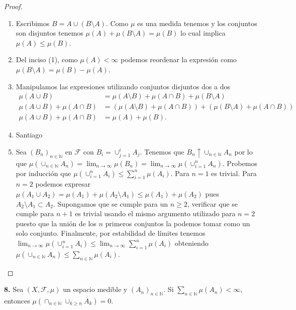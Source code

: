 \documentclass{article}
\newenvironment{statement}[1]{\smallskip\noindent\color[rgb]{1.00,0.00,0.50} {\bf #1.}}{}
\theoremstyle{definition}
\theoremstyle{remark}
\newcommand{\BN}{\mathbb N}
\begin{document}
\begin{proof}
  \begin{enumerate}
    \item Escribimos $B = A \cup (B \setminus A)$. Como $\mu$ es una medida tenemos y los conjuntos son disjuntos tenemos
      $\mu(A) + \mu(B \setminus A) = \mu(B)$ lo cual implica $\mu(A) \leq \mu(B)$.
    \item Del inciso (1), como $\mu(A) < \infty$ podemos reordenar la expresi\'on como $\mu(B \setminus A) = \mu(B) - \mu(A)$.
    \item Manipulamos las expresiones utilizando conjuntos disjuntos dos a dos
      \begin{align*}
        \mu(A \cup B) &= \mu(A \setminus B) + \mu(A \cap B) + \mu(B \setminus A)\\
        \mu(A \cup B) + \mu(A \cap B) &= (\mu(A \setminus B) + \mu(A \cap B)) + (\mu(B \setminus A) + \mu(A \cap B))\\
        \mu(A \cup B) + \mu(A \cap B) &= \mu(A) + \mu(B).
      \end{align*}
    \item Santiago
    \item Sea $(B_n)_{n \in \BN}$ en $\mathcal{F}$ con $B_i = \cup_{j = 1}^i A_j$.
      Tenemos que $B_n \uparrow \cup_{n \in \BN} A_n$ por lo que $\mu(\cup_{n \in \BN} A_n) = \lim_{n \to \infty} \mu(B_n) = \lim_{n \to \infty} \mu(\cup_{i = 1}^n A_n)$.
      Probemos por inducci\'on que $\mu(\cup_{i = 1}^n A_i) \leq \sum_{i = 1}^n \mu(A_i)$. Para $n = 1$ es trivial.
      Para $n = 2$ podemos expresar $\mu(A_1 \cup A_2) = \mu(A_1) + \mu(A_2 \setminus A_1) \leq \mu(A_1) + \mu(A_2)$ pues $A_2 \setminus A_1 \subset A_2$.
      Supongamos que se cumple para un $n \geq 2$, verificar que se cumple para $n + 1$ es trivial usando el mismo argumento utilizado para $n = 2$ puesto que la uni\'on de los $n$ primeros conjuntos la podemos tomar como un solo conjunto.
      Finalmente, por estabilidad de l\'imites tenemos $\lim_{n \to \infty} \mu(\cup_{i = 1}^n A_i) \leq \lim_{n \to \infty} \sum_{i = 1}^n \mu(A_i)$ obteniendo $\mu(\cup_{n \in \BN} A_n) \leq \sum_{n \in \BN} \mu(A_i)$.
  \end{enumerate}
\end{proof}

\begin{statement}{8}
  Sea $(X, \mathcal{F}, \mu)$ un espacio medible y $(A_n)_{n \in \BN}$. Si $\sum_{n \in \BN} \mu(A_n) < \infty$, entonces $\mu(\cap_{n \in \BN} \cup_{k \geq n} A_k) = 0$.
\end{statement}
\end{document}
